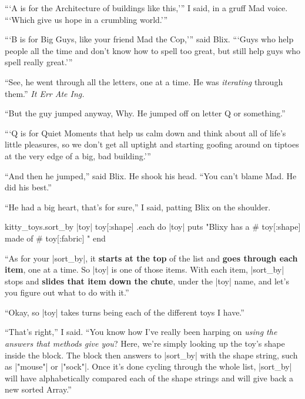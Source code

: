 \documentclass[12pt,twoside]{report}
\begin{document}
```A is for the Architecture of buildings like this,''' I said, in a
gruff Mad voice. ```Which give us hope in a crumbling world.'''

```B is for Big Guys, like your friend Mad the Cop,''' said Blix.
```Guys who help people all the time and don't know how to spell too
great, but still help guys who spell really great.'''

``See, he went through all the letters, one at a time.  He was {\em
  iterating} through them.'' {\em It Err Ate Ing.}

``But the guy jumped anyway, Why.  He jumped off on letter Q or
something.''

```Q is for Quiet Moments that help us calm down and think about all
of life's little pleasures, so we don't get all uptight and starting
goofing around on tiptoes at the very edge of a big, bad building.'''

``And then he jumped,'' said Blix.  He shook his head.  ``You can't
blame Mad.  He did his best.''

``He had a big heart, that's for sure,'' I said, patting Blix on the
shoulder.


\begin{rubycode}

 kitty_toys.sort_by { |toy| toy[:shape] }.each do |toy|
   puts "Blixy has a #{ toy[:shape] } made of #{ toy[:fabric] }"
 end

\end{rubycode}

\bigskip

\pagebreak

``As for your \rubyinline|sort_by|, it {\bf starts at
  the top} of the list and {\bf goes through each item}, one at a
time. So \rubyinline|toy| is one of those items.  With
each item, \rubyinline|sort_by| stops and {\bf slides
  that item down the chute}, under the
\rubyinline|toy| name, and let's you figure out what
to do with it.''

``Okay, so \rubyinline|toy| takes turns being each of
the different toys I have.''

``That's right,'' I said.  ``You know how I've really been harping on
{\em using the answers that methods give you}?  Here, we're simply
looking up the toy's shape inside the block.  The block then answers
to \rubyinline|sort_by| with the shape string, such as
\rubyinline|"mouse"| or
\rubyinline|"sock"|.  Once it's done cycling through
the whole list, \rubyinline|sort_by| will have
alphabetically compared each of the shape strings and will give back a
new sorted Array.''
\end{document}
